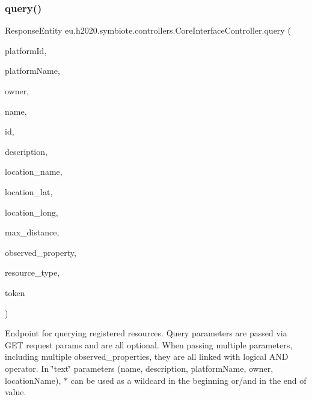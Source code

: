 \subsubsection{\texorpdfstring{query()}{query()}}
{\footnotesize\ttfamily Response\+Entity eu.\+h2020.\+symbiote.\+controllers.\+Core\+Interface\+Controller.\+query (\begin{DoxyParamCaption}\item[{@Request\+Param(value=\char`\"{}platform\+\_\+id\char`\"{}, required=false) String}]{platform\+Id,  }\item[{@Request\+Param(value=\char`\"{}platform\+\_\+name\char`\"{}, required=false) String}]{platform\+Name,  }\item[{@Request\+Param(value=\char`\"{}owner\char`\"{}, required=false) String}]{owner,  }\item[{@Request\+Param(value=\char`\"{}name\char`\"{}, required=false) String}]{name,  }\item[{@Request\+Param(value=\char`\"{}id\char`\"{}, required=false) String}]{id,  }\item[{@Request\+Param(value=\char`\"{}description\char`\"{}, required=false) String}]{description,  }\item[{@Request\+Param(value=\char`\"{}location\+\_\+name\char`\"{}, required=false) String}]{location\+\_\+name,  }\item[{@Request\+Param(value=\char`\"{}location\+\_\+lat\char`\"{}, required=false) Double}]{location\+\_\+lat,  }\item[{@Request\+Param(value=\char`\"{}location\+\_\+long\char`\"{}, required=false) Double}]{location\+\_\+long,  }\item[{@Request\+Param(value=\char`\"{}max\+\_\+distance\char`\"{}, required=false) Integer}]{max\+\_\+distance,  }\item[{@Request\+Param(value=\char`\"{}observed\+\_\+property\char`\"{}, required=false) String \mbox{[}$\,$\mbox{]}}]{observed\+\_\+property,  }\item[{@Request\+Param(value=\char`\"{}resource\+\_\+type\char`\"{}, required=false) String}]{resource\+\_\+type,  }\item[{@Request\+Header(\char`\"{}X-\/Auth-\/Token\char`\"{}) String}]{token }\end{DoxyParamCaption})}

Endpoint for querying registered resources. Query parameters are passed via G\+ET request params and are all optional. When passing multiple parameters, including multiple observed\+\_\+properties, they are all linked with logical A\+ND operator. In \char`\"{}text\char`\"{} parameters (name, description, platform\+Name, owner, location\+Name), $\ast$ can be used as a wildcard in the beginning or/and in the end of value.


